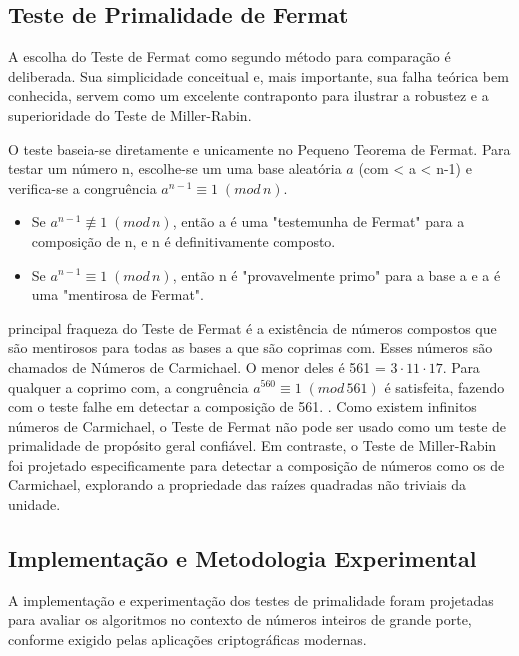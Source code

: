 \documentclass[a4paper, 11pt]{article}
\begin{document}
\subsection{Teste de Primalidade de Fermat}

A escolha do Teste de Fermat como segundo método para comparação é deliberada. Sua simplicidade conceitual e, mais importante, sua falha teórica bem conhecida, servem como um excelente contraponto para ilustrar a robustez e a superioridade do Teste de Miller-Rabin.


O teste baseia-se diretamente e unicamente no Pequeno Teorema de Fermat. Para testar um número n, escolhe-se um uma base aleatória $a$ (com < a < n-1) e verifica-se a congruência $a^{n-1} \equiv 1 \; (mod \, n)$. \parencite{ma2014fermat}

\begin{itemize}
    \item Se $a^{n-1} \not\equiv 1 \; (mod \, n)$, então a é uma "testemunha de Fermat" para a composição de n, e n é definitivamente composto.
    \item Se $a^{n-1} \equiv 1 \; (mod \, n)$, então n é "provavelmente primo" para a base a e a é uma "mentirosa de Fermat".
\end{itemize}

principal fraqueza do Teste de Fermat é a existência de números compostos que são mentirosos para todas as bases a que são coprimas com. Esses números são chamados de Números de Carmichael. O menor deles é 561 = $3 \cdot 11 \cdot 17$. Para qualquer a coprimo com, a congruência $a^{560} \equiv 1 \; (mod \, 561)$ é satisfeita, fazendo com o teste falhe em detectar a composição de 561. \parencite{wikipedia_pequeno_teorema_fermat}. Como existem infinitos números de Carmichael, o Teste de Fermat não pode ser usado como um teste de primalidade de propósito geral confiável. Em contraste, o Teste de Miller-Rabin foi projetado especificamente para detectar a composição de números como os de Carmichael, explorando a propriedade das raízes quadradas não triviais da unidade.

\subsection{Implementação e Metodologia Experimental}
A implementação e experimentação dos testes de primalidade foram projetadas para avaliar os algoritmos no contexto de números inteiros de grande porte, conforme exigido pelas aplicações criptográficas modernas.
\end{document}
